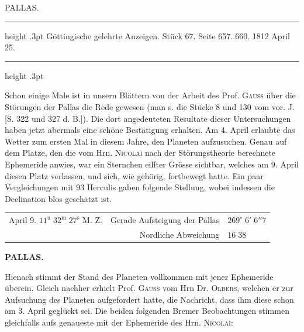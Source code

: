 \par\bigskip
{}
\hypertarget{native-354-lower}{}\label{native-354-lower}
\begin{center}\large PALLAS.\end{center}
\begin{center}
\parbox{.83\linewidth}{%
\centering\fontsize{8.2}{10.2}\selectfont
\hrule height .3pt\relax\vspace{2.5pt}
Göttingische gelehrte Anzeigen. Stück 67. Seite 657..660. 1812 April 25.\par
\vspace{2.5pt}\hrule height .3pt\relax
}
\end{center}

\par\indent Schon einige Male ist in unsern Blättern von der Arbeit des Prof. \textsc{Gauss} über die Störungen der Pallas die Rede gewesen (man s. die Stücke 8 und 130 vom vor. J. [S. 322 und 327 d. B.]). Die dort angedeuteten Resultate dieser Untersuchungen haben jetzt abermals eine schöne Bestätigung erhalten. Am 4. April erlaubte das Wetter zum ersten Mal in diesem Jahre, den Planeten aufzusuchen. Genau auf dem Platze, den die vom Hrn. \textsc{Nicolai} nach der Störungstheorie berechnete Ephemeride anwies, war ein Sternchen eilfter Grösse sichtbar, welches am 9. April diesen Platz verlassen, und sich, wie gehörig, fortbewegt hatte. Ein paar Vergleichungen mit 93 Herculis gaben folgende Stellung, wobei indessen die Declination blos geschätzt ist.

\begin{center}\fontsize{10}{12}\selectfont\setlength{\tabcolsep}{0pt}\renewcommand{\arraystretch}{1.15}\begin{tabular}{l@{\quad}r@{\enspace}l}
April 9. $11^{\mathrm u}\;32^{\mathrm m}\;27^{\mathrm s}$ M. Z. & Gerade Aufsteigung der Pallas & $269^\circ\;6'\;6''7$\\
 & Nordliche Abweichung & $16\;38$
\end{tabular}\end{center}
\clearpage
\thispagestyle{empty}
\noindent{}%
%
\parbox[t]{\dimexpr\linewidth-24mm\relax}{\centering\footnotesize\bfseries PALLAS.\par}%
\makebox[12mm][r]{}\par\nobreak\medskip
{}\par\indent Hienach stimmt der Stand des Planeten vollkommen mit jener Ephemeride überein. Gleich nachher erhielt Prof. \textsc{Gauss} vom Hrn Dr. \textsc{Olbers}, welchen er zur Aufsuchung des Planeten aufgefordert hatte, die Nachricht, dass ihm diese schon am 3. April geglückt sei. Die beiden folgenden Bremer Beobachtungen stimmen gleichfalls aufs genaueste mit der Ephemeride des Hrn. \textsc{Nicolai}:

